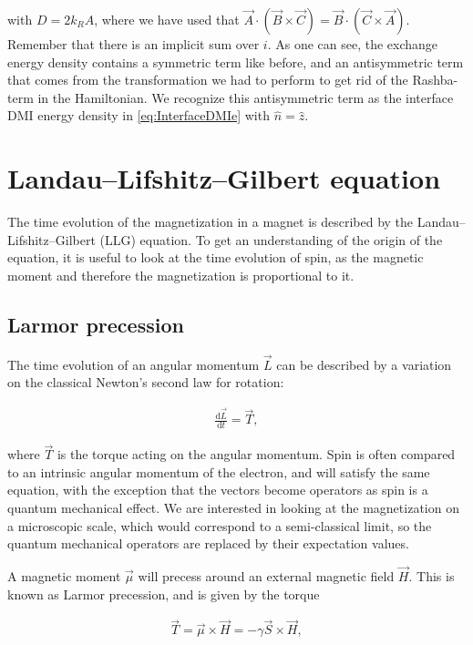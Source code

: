 \documentclass[1p]{elsarticle}		%
\numberwithin{equation}{section}
\begin{document}
with $D = 2k_RA$, where we have used that $\vec{A}\cdot(\vec{B}\times\vec{C}) = \vec{B}\cdot(\vec{C}\times\vec{A})$. Remember that there is an implicit sum over $i$. As one can see, the exchange energy density contains a symmetric term like before, and an antisymmetric term that comes from the transformation we had to perform to get rid of the Rashba-term in the Hamiltonian. We recognize this antisymmetric term as the interface DMI energy density in \eqref{eq:InterfaceDMIe} with $\hat{n} = \hat{z}$.

\section{Landau--Lifshitz--Gilbert equation}
The time evolution of the magnetization in a magnet is described by the Landau--Lifshitz--Gilbert (LLG) equation. To get an understanding of the origin of the equation, it is useful to look at the time evolution of spin, as the magnetic moment and therefore the magnetization is proportional to it. 

\subsection{Larmor precession}
The time evolution of an angular momentum $\vec{L}$ can be described by a variation on the classical Newton's second law for rotation:

\begin{align}
\label{eq:newton2rotation}
\frac{\textrm{d} \vec{L}}{\textrm{d} t} = \vec{T},
\end{align}

where $\vec{T}$ is the torque acting on the angular momentum. Spin is often compared to an intrinsic angular momentum of the electron, and will satisfy the same equation, with the exception that the vectors become operators as spin is a quantum mechanical effect. We are interested in looking at the magnetization on a microscopic scale, which would correspond to a semi-classical limit, so the quantum mechanical operators are replaced by their expectation values. 

A magnetic moment $\vec{\mu}$ will precess around an external magnetic field $\vec{H}$. This is known as Larmor precession, and is given by the torque

\begin{align}
\label{eq:larmortorque}
\vec{T} = \vec{\mu} \times \vec{H} = -\gamma \vec{S} \times \vec{H},
\end{align}
\end{document}
